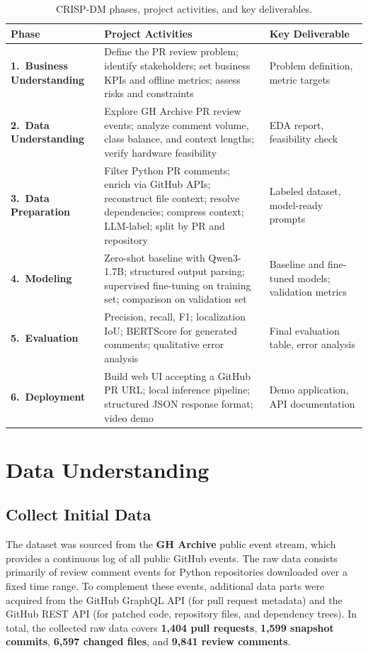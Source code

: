 \documentclass[11pt]{article}
\begin{document}
\begin{table}[H]
\centering
\caption{CRISP-DM phases, project activities, and key deliverables.}
\label{tab:crisp_dm}
\begin{tabular}{@{}p{3.5cm}p{7cm}p{3.5cm}@{}}
\toprule
\textbf{Phase} & \textbf{Project Activities} & \textbf{Key Deliverable} \\ \midrule
\textbf{1.\ Business Understanding} & Define the PR review problem; identify stakeholders; set business KPIs and offline metrics; assess risks and constraints & Problem definition, metric targets \\ \midrule
\textbf{2.\ Data Understanding} & Explore GH Archive PR review events; analyze comment volume, class balance, and context lengths; verify hardware feasibility & EDA report, feasibility check \\ \midrule
\textbf{3.\ Data Preparation} & Filter Python PR comments; enrich via GitHub APIs; reconstruct file context; resolve dependencies; compress context; LLM-label; split by PR and repository & Labeled dataset, model-ready prompts \\ \midrule
\textbf{4.\ Modeling} & Zero-shot baseline with Qwen3-1.7B; structured output parsing; supervised fine-tuning on training set; comparison on validation set & Baseline and fine-tuned models; validation metrics \\ \midrule
\textbf{5.\ Evaluation} & Precision, recall, F1; localization IoU; BERTScore for generated comments; qualitative error analysis & Final evaluation table, error analysis \\ \midrule
\textbf{6.\ Deployment} & Build web UI accepting a GitHub PR URL; local inference pipeline; structured JSON response format; video demo & Demo application, API documentation \\ \bottomrule
\end{tabular}
\end{table}

\section*{Data Understanding}

\subsection*{Collect Initial Data}

The dataset was sourced from the \textbf{GH Archive} public event stream, which provides a continuous log of all public GitHub events. The raw data consists primarily of review comment events for Python repositories downloaded over a fixed time range. To complement these events, additional data parts were acquired from the GitHub GraphQL API (for pull request metadata) and the GitHub REST API (for patched code, repository files, and dependency trees). In total, the collected raw data covers \textbf{1,404 pull requests}, \textbf{1,599 snapshot commits}, \textbf{6,597 changed files}, and \textbf{9,841 review comments}.
\end{document}
